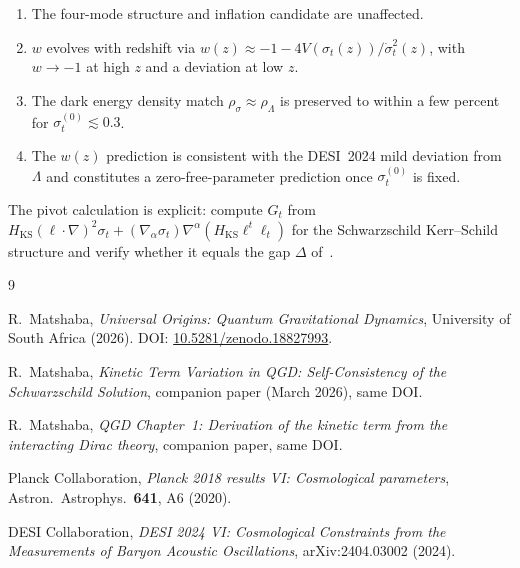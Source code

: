 \documentclass[11pt,a4paper]{article}
\theoremstyle{plain}
\theoremstyle{definition}
\theoremstyle{remark}
\newcommand{\dotv}{\dot\sigma_t}
\begin{document}
\begin{enumerate}
  \item The four-mode structure and inflation candidate are unaffected.
  \item $w$ evolves with redshift via $w(z) \approx -1 -
    4V(\sigma_t(z))/\dotv^2(z)$, with $w \to -1$ at high $z$ and
    a deviation at low $z$.
  \item The dark energy density match $\rho_\sigma \approx \rho_\Lambda$
    is preserved to within a few percent for $\sigma_t^{(0)} \lesssim
    0.3$.
  \item The $w(z)$ prediction is consistent with the DESI~2024 mild
    deviation from $\Lambda$ and constitutes a zero-free-parameter
    prediction once $\sigma_t^{(0)}$ is fixed.
\end{enumerate}

The pivot calculation is explicit: compute $G_t$ from
$H_{\mathrm{KS}}(\ell\cdot\nabla)^2\sigma_t + (\nabla_\alpha\sigma_t)
\nabla^\alpha(H_{\mathrm{KS}}\ell^t\ell_t)$ for the Schwarzschild
Kerr--Schild structure and verify whether it equals the gap
$\Delta$ of~\cite{matshaba2026:kin_var}.

\begin{thebibliography}{9}

R.~Matshaba,
\textit{Universal Origins: Quantum Gravitational Dynamics},
University of South Africa (2026).
DOI: \href{https://doi.org/10.5281/zenodo.18827993}{10.5281/zenodo.18827993}.

R.~Matshaba,
\textit{Kinetic Term Variation in QGD: Self-Consistency of the
Schwarzschild Solution},
companion paper (March 2026), same DOI.

R.~Matshaba,
\textit{QGD Chapter~1: Derivation of the kinetic term from the
interacting Dirac theory},
companion paper, same DOI.

Planck Collaboration,
\textit{Planck 2018 results VI: Cosmological parameters},
Astron.\ Astrophys.\ \textbf{641}, A6 (2020).

DESI Collaboration,
\textit{DESI 2024 VI: Cosmological Constraints from the Measurements
of Baryon Acoustic Oscillations},
arXiv:2404.03002 (2024).

\end{thebibliography}
\end{document}
